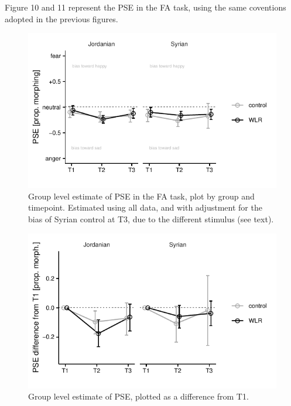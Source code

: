\documentclass[]{article}
\begin{document}
Figure 10 and 11 represent the PSE in the FA task, using the same
coventions adopted in the previous figures.

\begin{figure}[H]

{\centering \includegraphics{WLR-analyses-report_files/figure-latex/unnamed-chunk-12-1} 

}

\caption{Group level estimate of PSE in the FA task, plot by group and timepoint. Estimated using all data, and with adjustment for the bias of Syrian control at T3, due to the different stimulus (see text).}\label{fig:unnamed-chunk-12}
\end{figure}

\begin{figure}[H]

{\centering \includegraphics{WLR-analyses-report_files/figure-latex/unnamed-chunk-13-1} 

}

\caption{Group level estimate of PSE, plotted as a difference from T1.}\label{fig:unnamed-chunk-13}
\end{figure}
\end{document}
